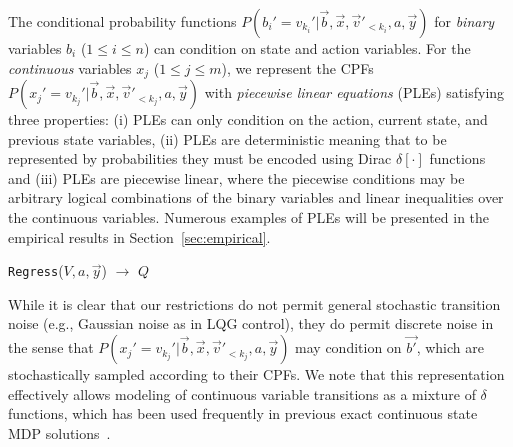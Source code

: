 The conditional probability functions
$P(b_i'=v_{k_i}'|\vec{b},\vec{x},\vec{v}'_{<{k_i}},a,\vec{y})$
for \emph{binary} variables $b_i$ ($1 \leq i \leq n$) can condition on
state and action variables.
For the \emph{continuous} variables $x_j$ ($1 \leq j \leq m$), we
represent the CPFs
$P(x_j'=v_{k_j}'|\vec{b},\vec{x},\vec{v}'_{<{k_j}},a,\vec{y})$
with \emph{piecewise linear equations} (PLEs) satisfying three
properties: (i) PLEs can only condition on the action, current state,
and previous state variables, (ii) PLEs are deterministic meaning that
to be represented by probabilities they must be encoded using Dirac
$\delta[\cdot]$ functions and (iii) PLEs are piecewise linear, where
the piecewise conditions may be arbitrary logical combinations of the
binary variables and linear inequalities over the continuous
variables. Numerous examples of PLEs will be presented in the empirical
results in Section~\ref{sec:empirical}.

\incmargin{1.5em}
\linesnumbered
\begin{algorithm}[t!]
\vspace{-.5mm}
\dontprintsemicolon
{}


\caption{\footnotesize \texttt{Regress}($V,a,\vec{y}$) $\longrightarrow$ $Q$ \label{alg:regress}}
\vspace{-1mm}
\end{algorithm}
\decmargin{1.5em}

While it is clear that our restrictions do not permit general
stochastic transition noise (e.g., Gaussian noise as in LQG control),
they do permit discrete noise in the sense that
$P(x_j'=v_{k_j}'|\vec{b},\vec{x},\vec{v}'_{<{k_j}},a,\vec{y})$ may
condition on $\vec{b'}$, which are stochastically sampled according to
their CPFs.  We note that this representation effectively allows
modeling of continuous variable transitions as a mixture of $\delta$
functions, which has been used frequently in previous exact continuous
state MDP solutions~\cite{feng04,hao09}.

